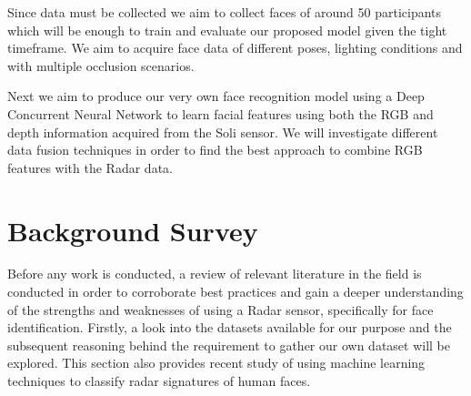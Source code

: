 \documentclass{interim}
\begin{document}
Since data must be collected we aim to collect faces of around 50 participants which will be enough to train and evaluate our proposed model given the tight timeframe. We aim to acquire face data of different poses, lighting conditions and with multiple occlusion scenarios.

Next we aim to produce our very own face recognition model using a Deep Concurrent Neural Network to learn facial features using both the RGB and depth information acquired from the Soli sensor. We will investigate different data fusion techniques in order to find the best approach to combine RGB features with the Radar data.



\section{Background Survey}
Before any work is conducted, a review of relevant literature in the field is conducted in order to corroborate best practices and gain a deeper understanding of the strengths and weaknesses of using a Radar sensor, specifically for face identification. Firstly, a look into the datasets available for our purpose and the subsequent reasoning behind the requirement to gather our own dataset will be explored. This section also provides recent study of using machine learning techniques to classify radar signatures of human faces. 
\end{document}
